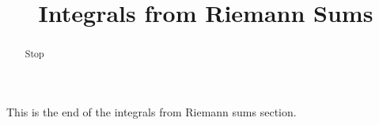 \documentclass[handout]{ximera}
\title{Integrals from Riemann Sums}
\begin{document}
\begin{abstract} Stop
\end{abstract}

\maketitle

This is the end of the integrals from Riemann sums section.
\end{document}
